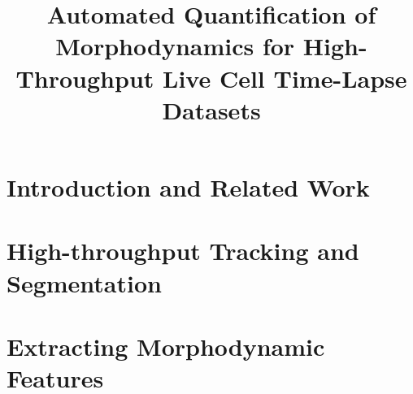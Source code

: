 \documentclass{article}
\begin{document}
%
%
%
%
\title{Automated Quantification of Morphodynamics
for High-Throughput Live Cell Time-Lapse Datasets}


%
\address{$^{1}$ Magnetic Resonance Imaging Group, MIT \hspace{5mm} 
         $^{2}$ Institute of Biochemistry, University of Basel \\
         $^{3}$ Computer Vision Lab, EPFL \hspace{5mm} 
         $^{4}$ Light Microscopy and Screening Center, ETHZ}


\newcommand{\comment}[1]{}
\maketitle              %

\begin{abstract}

\end{abstract}

\section{Introduction and Related Work}
\label{sec:intro}


%

\section{High-throughput Tracking and Segmentation}
\label{sec:method}


\section{Extracting Morphodynamic Features}
\label{sec:features}

\end{document}

